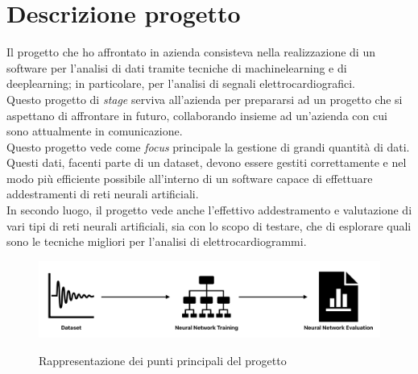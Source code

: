 \section{Descrizione progetto}\label{sec:project-description}\noindent
Il progetto che ho affrontato in azienda consisteva nella realizzazione di un software per l'analisi di dati tramite tecniche di \gls{machinelearning} e di \gls{deeplearning}; in particolare, per l'analisi di segnali elettrocardiografici.\\
Questo progetto di \textit{stage} serviva all'azienda per prepararsi ad un progetto che si aspettano di affrontare in futuro, collaborando insieme ad un'azienda con cui sono attualmente in comunicazione.\\
Questo progetto vede come \textit{focus} principale la gestione di grandi quantità di dati. Questi dati, facenti parte di un \gls{dataset}, devono essere gestiti correttamente e nel modo più efficiente possibile all'interno di un software capace di effettuare addestramenti di reti neurali artificiali.\\
In secondo luogo, il progetto vede anche l'effettivo addestramento e valutazione di vari tipi di reti neurali artificiali, sia con lo scopo di testare, che di esplorare quali sono le tecniche migliori per l'analisi di elettrocardiogrammi.
\begin{figure}[H]
    \centering
    \includegraphics[alt={Rappresentazione dei punti principali del progetto}, width=0.9\columnwidth]{img/desc_proj.png}
    \caption{\centering Rappresentazione dei punti principali del progetto}
    \label{fig:desc-proj}
\end{figure}

